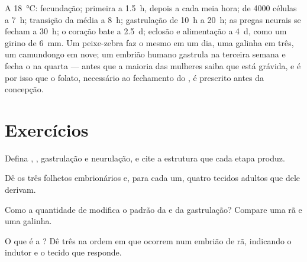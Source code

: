 \begin{example}\label{ex:b2:vertebrate-development:timetable}
A \qty{18}{\celsius}: fecundação; primeira  a \qty{1.5}{h},
depois a cada meia hora;  de \num{4000} células a \qty{7}{h};
transição da  média a \qty{8}{h}; gastrulação de \qty{10}{h} a
\qty{20}{h}; as pregas neurais se fecham a \qty{30}{h}; o coração bate a
\qty{2.5}{d}; eclosão e alimentação a \qty{4}{d}, como um girino de
\qty{6}{mm}. Um peixe-zebra faz o mesmo em um dia, uma galinha em três,
um camundongo em nove; um embrião humano gastrula na terceira semana e
fecha o  na quarta --- antes que a maioria das mulheres saiba
que está grávida, e é por isso que o folato, necessário ao fechamento
do , é prescrito antes da concepção.
\end{example}

\section{Exercícios}

\begin{exercise}[$\star$]\label{exo:b2:vertebrate-development:1}
Defina , , gastrulação e neurulação, e cite a
estrutura que cada etapa produz.
\end{exercise}

\begin{exercise}[$\star$]\label{exo:b2:vertebrate-development:2}
Dê os três folhetos embrionários e, para cada um, quatro tecidos
adultos que dele derivam.
\end{exercise}

\begin{exercise}[$\star$]\label{exo:b2:vertebrate-development:3}
Como a quantidade de  modifica o padrão da  e da
gastrulação? Compare uma rã e uma galinha.
\end{exercise}

\begin{exercise}[$\star$]\label{exo:b2:vertebrate-development:4}
O que é a ? Dê três  na ordem em que ocorrem num
embrião de rã, indicando o indutor e o tecido que responde.
\end{exercise}

